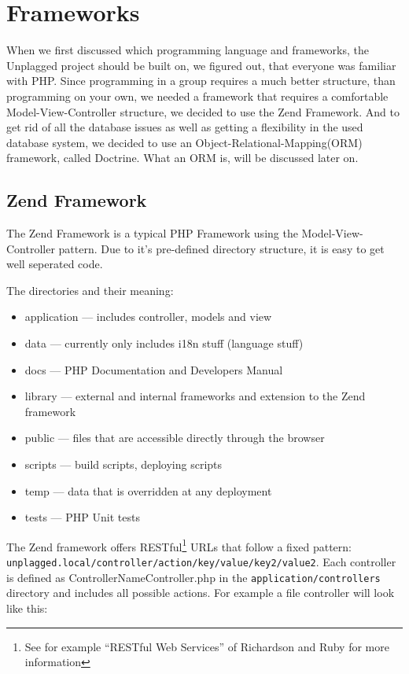 \section{Frameworks}
When we first discussed which programming language and frameworks, the Unplagged project should be built on, we figured 
out, that everyone was familiar with PHP. Since programming in a group requires a much better structure, than programming 
on your own, we needed a framework that requires a comfortable Model-View-Controller structure, we decided to use the Zend 
Framework. And to get rid of all the database issues as well as getting a flexibility in the used database system, we 
decided to use an Object-Relational-Mapping(ORM) framework, called Doctrine. What an ORM is, will be discussed later on.

\subsection{Zend Framework}
The Zend Framework is a typical PHP Framework using the Model-View-Controller pattern. Due to it's pre-defined directory 
structure, it is easy to get well seperated code. 

The directories and their meaning:
\begin{itemize}
\item application --- includes controller, models and view
\item data --- currently only includes i18n stuff (language stuff)
\item docs --- PHP Documentation and Developers Manual
\item library --- external and internal frameworks and extension to the Zend framework
\item public --- files that are accessible directly through the browser
\item scripts --- build scripts, deploying scripts
\item temp --- data that is overridden at any deployment
\item tests --- PHP Unit tests
\end{itemize}

The Zend framework offers RESTful\footnote{See for example \enquote{RESTful Web Services} of Richardson and Ruby for 
more information} URLs that follow a fixed pattern: \texttt{unplagged.local/controller/action/key/value/key2/value2}. Each 
controller is defined as ControllerNameController.php in the \texttt{application/controllers} directory and includes 
all possible actions. For example a file controller will look like this:

